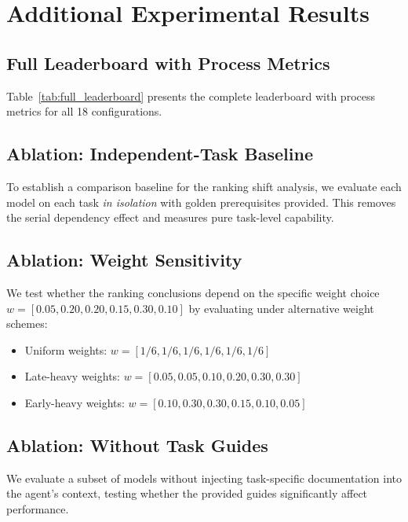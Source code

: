 \section{Additional Experimental Results}

\subsection{Full Leaderboard with Process Metrics}


Table~\ref{tab:full_leaderboard} presents the complete \evobench{} leaderboard with process metrics for all 18 configurations.

\subsection{Ablation: Independent-Task Baseline}

To establish a comparison baseline for the ranking shift analysis, we evaluate each model on each task \emph{in isolation} with golden prerequisites provided.
This removes the serial dependency effect and measures pure task-level capability.


\subsection{Ablation: Weight Sensitivity}

We test whether the ranking conclusions depend on the specific weight choice $w = [0.05, 0.20, 0.20, 0.15, 0.30, 0.10]$ by evaluating under alternative weight schemes:
\begin{itemize}[nosep]
\item Uniform weights: $w = [1/6, 1/6, 1/6, 1/6, 1/6, 1/6]$
\item Late-heavy weights: $w = [0.05, 0.05, 0.10, 0.20, 0.30, 0.30]$
\item Early-heavy weights: $w = [0.10, 0.30, 0.30, 0.15, 0.10, 0.05]$
\end{itemize}


\subsection{Ablation: Without Task Guides}

We evaluate a subset of models without injecting task-specific documentation into the agent's context, testing whether the provided guides significantly affect performance.

